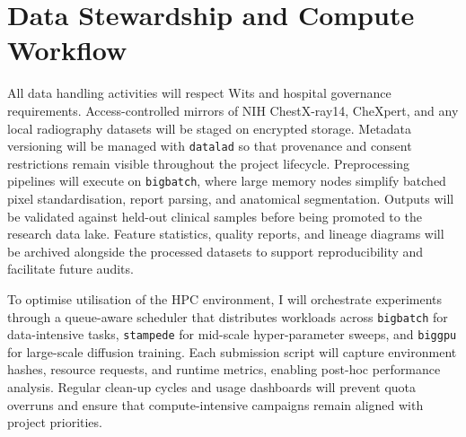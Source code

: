 \section{Data Stewardship and Compute Workflow}
All data handling activities will respect Wits and hospital governance requirements. Access-controlled mirrors of NIH ChestX-ray14, CheXpert, and any local radiography datasets will be staged on encrypted storage. Metadata versioning will be managed with \texttt{datalad} so that provenance and consent restrictions remain visible throughout the project lifecycle. Preprocessing pipelines will execute on \texttt{bigbatch}, where large memory nodes simplify batched pixel standardisation, report parsing, and anatomical segmentation. Outputs will be validated against held-out clinical samples before being promoted to the research data lake. Feature statistics, quality reports, and lineage diagrams will be archived alongside the processed datasets to support reproducibility and facilitate future audits.

To optimise utilisation of the HPC environment, I will orchestrate experiments through a queue-aware scheduler that distributes workloads across \texttt{bigbatch} for data-intensive tasks, \texttt{stampede} for mid-scale hyper-parameter sweeps, and \texttt{biggpu} for large-scale diffusion training. Each submission script will capture environment hashes, resource requests, and runtime metrics, enabling post-hoc performance analysis. Regular clean-up cycles and usage dashboards will prevent quota overruns and ensure that compute-intensive campaigns remain aligned with project priorities.